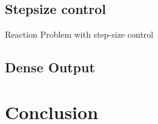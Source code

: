 \documentclass[a4paper]{scrartcl}
\numberwithin{equation}{section}
\theoremstyle{plain}
\theoremstyle{definition}
\numberwithin{theorem}{section}
\newcommand{\1}{\mathbbm{1}}
\begin{document}
\subsection{Stepsize control}

Reaction Problem with step-size control

\subsection{Dense Output}


\section{Conclusion} \label{sec:conclusion}




\printbibliography
\end{document}

